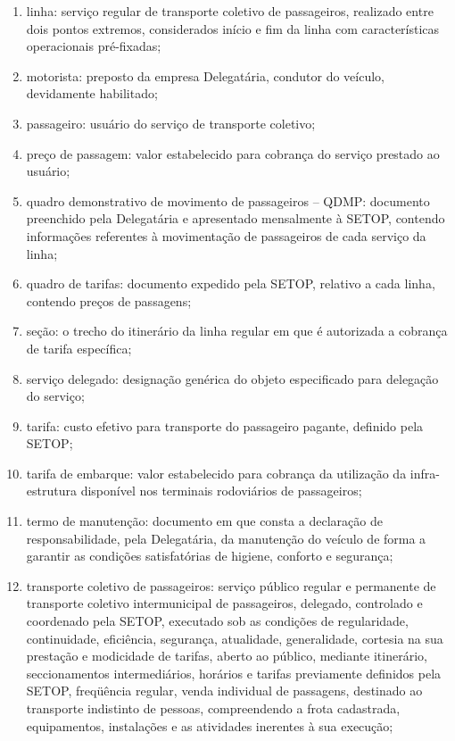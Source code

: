 \begin{enumerate}[resume,label=Art. \arabic*]
\begin{enumerate}[label=\roman*.]
\item linha: serviço regular de transporte coletivo de passageiros, realizado entre dois pontos extremos, considerados início e fim da linha com características operacionais pré-fixadas;

\item motorista: preposto da empresa Delegatária, condutor do veículo, devidamente habilitado;

\item passageiro: usuário do serviço de transporte coletivo;

\item preço de passagem: valor estabelecido para cobrança do serviço prestado ao usuário;

\item quadro demonstrativo de movimento de passageiros – QDMP: documento preenchido pela Delegatária e apresentado mensalmente à SETOP, contendo informações referentes à movimentação de passageiros de cada serviço da linha;

\item quadro de tarifas: documento expedido pela SETOP, relativo a cada linha, contendo preços de passagens;

\item seção: o trecho do itinerário da linha regular em que é autorizada a cobrança de tarifa específica;

\item serviço delegado: designação genérica do objeto especificado para delegação do serviço;

\item tarifa: custo efetivo para transporte do passageiro pagante, definido pela SETOP;

\item tarifa de embarque: valor estabelecido para cobrança da utilização da infra-estrutura disponível nos terminais rodoviários de passageiros;

\item termo de manutenção: documento em que consta a declaração de responsabilidade, pela Delegatária, da manutenção do veículo de forma a garantir as condições satisfatórias de higiene, conforto e segurança;

\item transporte coletivo de passageiros: serviço público regular e permanente de transporte coletivo intermunicipal de passageiros, delegado, controlado e coordenado pela SETOP, executado sob as condições de regularidade, continuidade, eficiência, segurança, atualidade, generalidade, cortesia na sua prestação e modicidade de tarifas, aberto ao público, mediante itinerário, seccionamentos intermediários, horários e tarifas previamente definidos pela SETOP, freqüência regular, venda individual de passagens, destinado ao transporte indistinto de pessoas, compreendendo a frota cadastrada, equipamentos, instalações e as atividades inerentes à sua execução;


\end{enumerate}
\end{enumerate}
